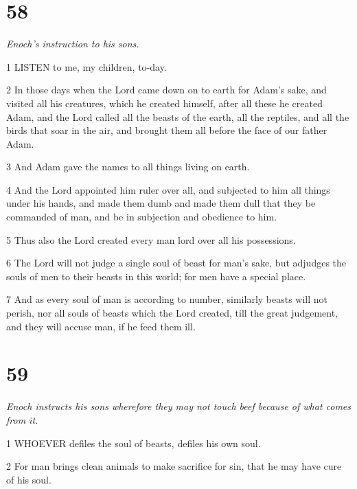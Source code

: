 \chapter{58}

\par \textit{Enoch's instruction to his sons.}

\par 1 LISTEN to me, my children, to-day.

\par 2 In those days when the Lord came down on to earth for Adam's sake, and visited all his creatures, which he created himself, after all these he created Adam, and the Lord called all the beasts of the earth, all the reptiles, and all the birds that soar in the air, and brought them all before the face of our father Adam.

\par 3 And Adam gave the names to all things living on earth.

\par 4 And the Lord appointed him ruler over all, and subjected to him all things under his hands, and made them dumb and made them dull that they be commanded of man, and be in subjection and obedience to him.

\par 5 Thus also the Lord created every man lord over all his possessions.

\par 6 The Lord will not judge a single soul of beast for man's sake, but adjudges the souls of men to their beasts in this world; for men have a special place.

\par 7 And as every soul of man is according to number, similarly beasts will not perish, nor all souls of beasts which the Lord created, till the great judgement, and they will accuse man, if he feed them ill.

\chapter{59}

\par \textit{Enoch instructs his sons wherefore they may not touch beef because of what comes from it.}

\par 1 WHOEVER defiles the soul of beasts, defiles his own soul.

\par 2 For man brings clean animals to make sacrifice for sin, that he may have cure of his soul.

